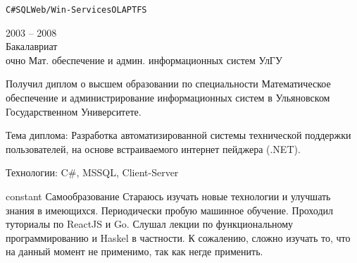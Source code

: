 \begin{entrylist}
{		\texttt{C\#}\slashsep\texttt{SQL}\slashsep\texttt{Web/Win-Services}\slashsep\texttt{OLAP}\slashsep\texttt{TFS}}

\end{entrylist}



\begin{entrylist}
	\entry
		{2003 -- 2008\\\footnotesize{Бакалавриат\\очно}}
		{Мат. обеспечение и админ. информационных систем}
		{УлГУ}
		{Получил диплом о высшем образовании по специальности Математическое обеспечение и администрирование информационных систем в Ульяновском Государственном Университете.

		Тема диплома: Разработка автоматизированной системы технической поддержки пользователей, на основе встраиваемого интернет пейджера (.NET).

		Технологии: C\#, MSSQL, Client-Server
		}
	\entry
		{constant}
		{Самообразование}
		{}
		{Стараюсь изучать новые технологии и улучшать знания в имеющихся. Периодически пробую машинное обучение. Проходил туториалы по ReactJS и Go. Слушал лекции по функциональному программированию и Haskel в частности. К сожалению, сложно изучать то, что на данный момент не применимо, так как негде применить. }
\end{entrylist}


